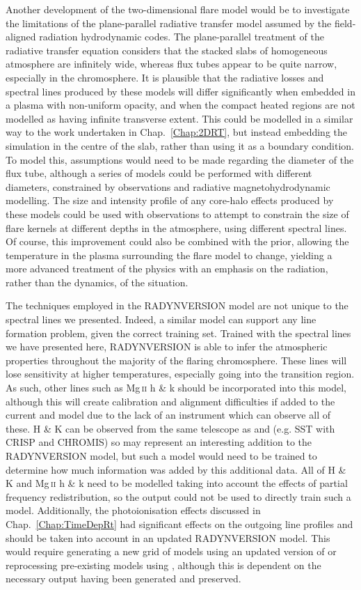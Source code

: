 Another development of the two-dimensional flare model would be to investigate the limitations of the  plane-parallel radiative transfer model assumed by the field-aligned radiation hydrodynamic codes.
The plane-parallel treatment of the radiative transfer equation considers that the stacked slabs of homogeneous atmosphere are infinitely wide, whereas flux tubes appear to be quite narrow, especially in the chromosphere.
It is plausible that the radiative losses and spectral lines produced by these models will differ significantly when embedded in a plasma with non-uniform opacity, and when the compact heated regions are not modelled as having infinite transverse extent.
This could be modelled in a similar way to the work undertaken in Chap.~\ref{Chap:2DRT}, but instead embedding the \Radyn{} simulation in the centre of the slab, rather than using it as a boundary condition.
To model this, assumptions would need to be made regarding the diameter of the flux tube, although a series of models could be performed with different diameters, constrained by observations and radiative magnetohydrodynamic modelling.
The size and intensity profile of any core-halo effects produced by these models could be used with observations to attempt to constrain the size of flare kernels at different depths in the atmosphere, using different spectral lines.
Of course, this improvement could also be combined with the prior, allowing the temperature in the plasma surrounding the flare model to change, yielding a more advanced treatment of the physics with an emphasis on the radiation, rather than the dynamics, of the situation.

The techniques employed in the RADYNVERSION model are not unique to the spectral lines we presented.
Indeed, a similar model can support any line formation problem, given the correct training set.
Trained with the spectral lines we have presented here, RADYNVERSION is able to infer the atmospheric properties throughout the majority of the flaring chromosphere.
These lines will lose sensitivity at higher temperatures, especially going into the transition region.
As such, other lines such as Mg\,\textsc{ii} h \& k should be incorporated into this model, although this will create calibration and alignment difficulties if added to the current \Ha{} and \CaLine{} model due to the lack of an instrument which can observe all of these.
\Caii{} H \& K can be observed from the same telescope as \Ha{} and \CaLine{} (e.g. SST with CRISP and CHROMIS) so may represent an interesting addition to the RADYNVERSION model, but such a model would need to be trained to determine how much information was added by this additional data.
All of \Caii{} H \& K and Mg\,\textsc{ii} h \& k need to be modelled taking into account the effects of partial frequency redistribution, so the \Radyn{} output could not be used to directly train such a model.
Additionally, the \Caii{} photoionisation effects discussed in Chap.~\ref{Chap:TimeDepRt} had significant effects on the outgoing line profiles and should be taken into account in an updated RADYNVERSION model.
This would require generating a new grid of models using an updated version of \Radyn{} or reprocessing pre-existing models using \Lw{}, although this is dependent on the necessary output having been generated and preserved.

